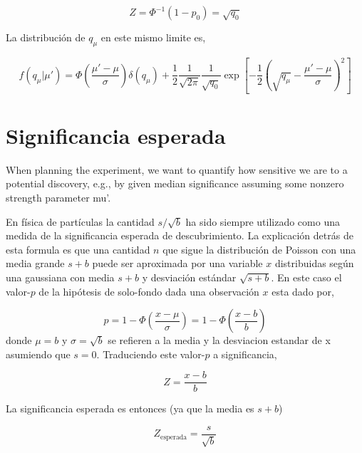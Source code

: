 \begin{equation}
  Z = \Phi^{-1} (1-p_0) = \sqrt{q_0}
\end{equation}


La distribución de $q_\mu$ en este mismo limite es,

\begin{equation}
  f(q_\mu|\mu') = \Phi\left(\frac{\mu'-\mu}{\sigma}\right) \delta(q_\mu) +
  \frac{1}{2}\frac{1}{\sqrt{2\pi}}\frac{1}{\sqrt{q_0}} \exp \left[ -\frac{1}{2} \left( \sqrt{q_\mu} - \frac{\mu'-\mu}{\sigma} \right)^2\right]
\end{equation}


\section{Significancia esperada} %

When planning the experiment, we want to quantify how sensitive
we are to a potential discovery, e.g., by given median significance
assuming some nonzero strength parameter mu'.


En física de partículas la cantidad $s/\sqrt{b}$ ha sido siempre utilizado como
una medida de la significancia esperada de descubrimiento. La explicación detrás
de esta formula es que una cantidad $n$ que sigue la distribución de Poisson con
una media grande $s+b$ puede ser aproximada por una variable $x$ distribuidas según
una gaussiana con media $s+b$ y desviación estándar $\sqrt{s+b}$. En este caso
el valor-$p$ de la hipótesis de solo-fondo dada una observación $x$ esta dado por,

\begin{equation}
  p = 1 - \Phi \left( \frac{x-\mu}{\sigma} \right) = 1 - \Phi \left( \frac{x-b}{b} \right)
\end{equation}
%
donde $\mu=b$ y $\sigma = \sqrt{b}$ se refieren a la media y la desviacion estandar de x
asumiendo que $s=0$. Traduciendo este valor-$p$ a significancia,

\begin{equation}
  Z = \frac{x-b}{b}
\end{equation}

La significancia esperada es entonces (ya que la media es $s+b$)

\begin{equation}
  Z_\text{esperada} = \frac{s}{\sqrt{b}}
  \label{eq:Zsimple}
\end{equation}

